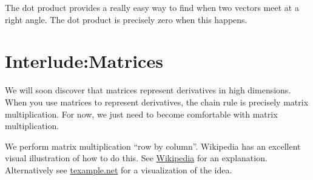 The dot product provides a really easy way to find when two vectors meet at a right angle. The dot product is precisely zero when this happens.




\ifvalpo
\section{Interlude:Matrices}\label{review:matrices}
We will soon discover that matrices represent derivatives in high dimensions. When you use matrices to represent derivatives, the chain rule is precisely matrix multiplication. For now, we just need to become comfortable with matrix multiplication.

We perform matrix multiplication ``row by column''.  Wikipedia has an excellent visual illustration of how to do this. See 
\href{http://en.wikipedia.org/wiki/Matrix\_multiplication}{Wikipedia} for an explanation. Alternatively see \href{http://www.texample.net/tikz/examples/matrix-multiplication/}{texample.net} for a visualization of the idea.

